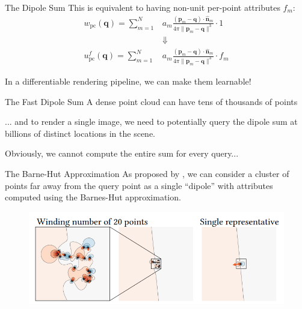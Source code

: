 \documentclass[10pt]{beamer}
\newcommand{\bp}{\mathbf{p}}
\newcommand{\bq}{\mathbf{q}}
\newcommand{\bn}{\mathbf{n}}
\begin{document}
\begin{frame}{The Dipole Sum}
    This is equivalent to having non-unit \alert{per-point} attributes \(f_m\):
    \begin{align*}
        w_{\mathrm{pc}}(\bq) = \sum_{m=1}^{N}   & a_m \frac{(\bp_m - \bq)\cdot \widehat{\bn}_m}{4\pi\|\bp_m - \bq\|^3} \cdot 1     \\
                                                & \Downarrow                                                                       \\
        u^f_{\mathrm{pc}}(\bq) = \sum_{m=1}^{N} & a_m \frac{(\bp_m - \bq) \cdot \widehat{\bn}_m}{4\pi \|\bp_m - \bq\|^3} \cdot f_m
    \end{align*}

    In a differentiable rendering pipeline, we can make them learnable!
\end{frame}

\begin{frame}{The \alert{Fast} Dipole Sum}
    A dense point cloud can have \alert{tens of thousands} of points

    ... and to render a single image, we need to potentially query the dipole sum at \alert{billions} of distinct locations in the scene.

    Obviously, we cannot compute the entire sum for every query...
\end{frame}

\begin{frame}{The Barne-Hut Approximation}
    As proposed by \citet{Barill:FW:2018}, we can consider a cluster of points far away from the query point as a single ``dipole'' with attributes computed using the \alert{Barnes-Hut approximation}.

    \begin{figure}
        \centering
        \includegraphics[width=0.9\linewidth]{figures/wn/barne_hut.png}
    \end{figure}
\end{frame}
\end{document}
